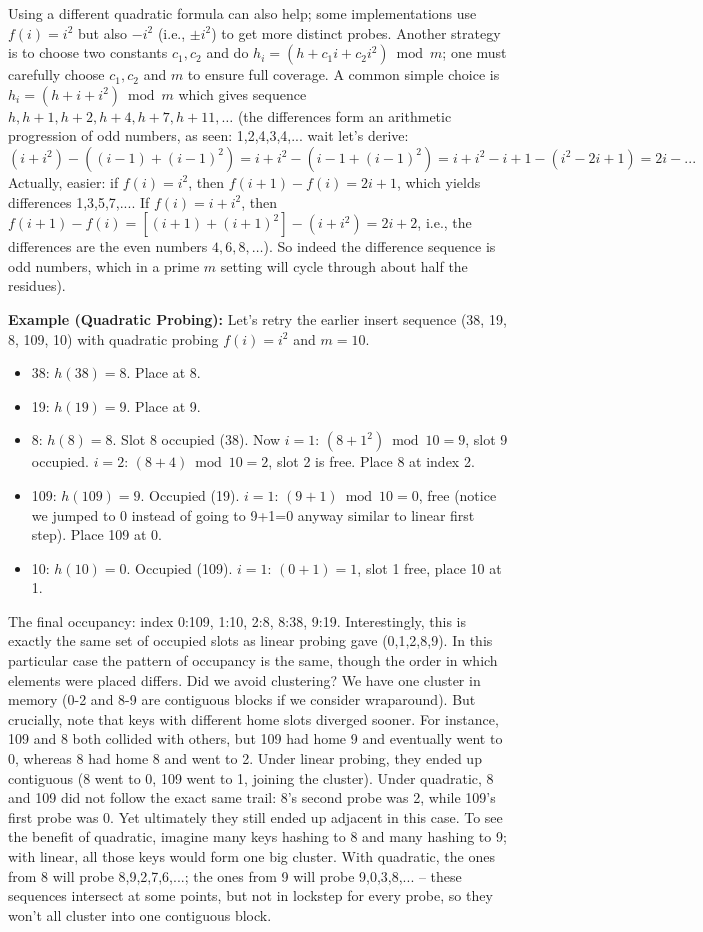 \documentclass[11pt]{article}
\begin{document}
Using a different quadratic formula can also help; some implementations use $f(i) = i^2$ but also $-i^2$ (i.e., $\pm i^2$) to get more distinct probes. Another strategy is to choose two constants $c_1, c_2$ and do $h_i = (h + c_1 i + c_2 i^2) \bmod m$; one must carefully choose $c_1, c_2$ and $m$ to ensure full coverage. A common simple choice is $h_i = (h + i + i^2) \bmod m$ which gives sequence $h, h+1, h+2, h+4, h+7, h+11, \ldots$ (the differences form an arithmetic progression of odd numbers, as seen: 1,2,4,3,4,... wait let's derive: $(i+ i^2) - ((i-1)+(i-1)^2) = i + i^2 - (i-1 + (i-1)^2) = i + i^2 - i + 1 - (i^2 - 2i +1) = 2i - ...$ Actually, easier: if $f(i)=i^2$, then $f(i+1)-f(i) = 2i+1$, which yields differences 1,3,5,7,.... If $f(i)=i+i^2$, then $f(i{+}1)-f(i)=[(i{+}1)+(i{+}1)^2]-(i+i^2)=2i+2$, i.e., the differences are the even numbers $4,6,8,\dots$). So indeed the difference sequence is odd numbers, which in a prime $m$ setting will cycle through about half the residues).

\textbf{Example (Quadratic Probing):} Let’s retry the earlier insert sequence (38, 19, 8, 109, 10) with quadratic probing $f(i)=i^2$ and $m=10$. 
\begin{itemize}
  \item 38: $h(38)=8$. Place at 8.
  \item 19: $h(19)=9$. Place at 9.
  \item 8: $h(8)=8$. Slot 8 occupied (38). Now $i=1$: $(8 + 1^2) \bmod 10 = 9$, slot 9 occupied. $i=2$: $(8 + 4) \bmod 10 = 2$, slot 2 is free. Place 8 at index 2.
  \item 109: $h(109)=9$. Occupied (19). $i=1$: $(9+1) \bmod 10 = 0$, free (notice we jumped to 0 instead of going to 9+1=0 anyway similar to linear first step). Place 109 at 0.
  \item 10: $h(10)=0$. Occupied (109). $i=1$: $(0+1) = 1$, slot 1 free, place 10 at 1.
\end{itemize}
The final occupancy: index 0:109, 1:10, 2:8, 8:38, 9:19. Interestingly, this is exactly the same set of occupied slots as linear probing gave (0,1,2,8,9). In this particular case the pattern of occupancy is the same, though the order in which elements were placed differs. Did we avoid clustering? We have one cluster in memory (0-2 and 8-9 are contiguous blocks if we consider wraparound). But crucially, note that keys with different home slots diverged sooner. For instance, 109 and 8 both collided with others, but 109 had home 9 and eventually went to 0, whereas 8 had home 8 and went to 2. Under linear probing, they ended up contiguous (8 went to 0, 109 went to 1, joining the cluster). Under quadratic, 8 and 109 did not follow the exact same trail: 8’s second probe was 2, while 109’s first probe was 0. Yet ultimately they still ended up adjacent in this case. To see the benefit of quadratic, imagine many keys hashing to 8 and many hashing to 9; with linear, all those keys would form one big cluster. With quadratic, the ones from 8 will probe 8,9,2,7,6,...; the ones from 9 will probe 9,0,3,8,... – these sequences intersect at some points, but not in lockstep for every probe, so they won’t all cluster into one contiguous block.
\end{document}
